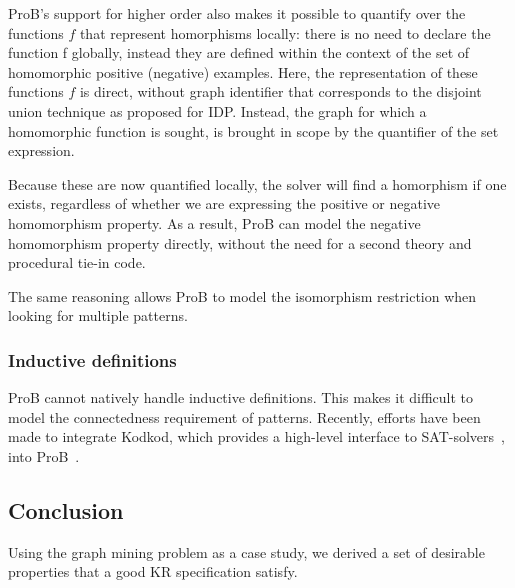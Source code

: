 ProB's support for higher order also makes it possible to quantify over the functions $f$ that represent homorphisms locally: there is no need to declare the function f globally, instead they are defined within the context of the set of homomorphic positive (negative) examples.
Here, the representation of these functions $f$ is direct, without graph identifier that corresponds to the disjoint union technique as proposed for IDP.
Instead, the graph  for which a homomorphic function is sought, is brought in scope by the quantifier of the set expression.

Because these are now quantified locally, the solver will find a homorphism if one exists, regardless of whether we are expressing the positive or negative homomorphism property.
As a result, ProB can model the negative homomorphism property directly, without the need for a second theory and procedural tie-in code.

The same reasoning allows ProB to model the isomorphism restriction when looking for multiple patterns.
\subsubsection{Inductive definitions}
ProB cannot natively handle inductive definitions.
This makes it difficult to model the connectedness requirement of patterns.
Recently, efforts have been made to integrate Kodkod, which provides a high-level interface to SAT-solvers~\citep{DBLP:conf/tacas/TorlakJ07}, into ProB~\citep{DBLP:conf/fm/PlaggeL12}.


\subsection{Conclusion}

Using the graph mining problem as a case study, we derived a set of desirable properties that a good KR specification satisfy.

